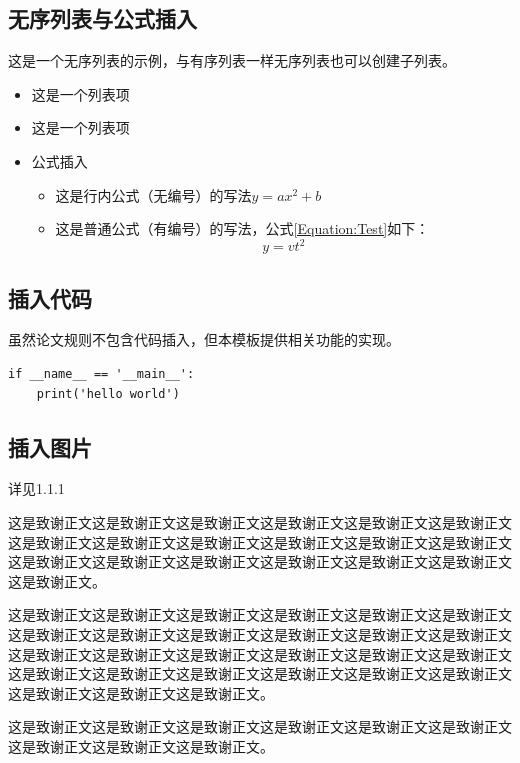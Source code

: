 \documentclass{bjfu}
\begin{document}
\subsection{无序列表与公式插入}
这是一个无序列表的示例，与有序列表一样无序列表也可以创建子列表。
\begin{itemize}
    \item 这是一个列表项
    \item 这是一个列表项
    \item 公式插入
    \begin{itemize}
        \item 这是行内公式（无编号）的写法$y=ax^2+b$
        \item 这是普通公式（有编号）的写法，公式\ref{Equation:Test}如下：
        \begin{equation}
            y=vt^2
            \label{Equation:Test}
        \end{equation}
    \end{itemize}
    
\end{itemize}

\subsection{插入代码}

虽然论文规则不包含代码插入，但本模板提供相关功能的实现。
\begin{verbatim}
if __name__ == '__main__':
    print('hello world')
\end{verbatim}

\subsection{插入图片}
详见1.1.1

\bjfuThanks
这是致谢正文这是致谢正文这是致谢正文这是致谢正文这是致谢正文这是致谢正文这是致谢正文这是致谢正文这是致谢正文这是致谢正文这是致谢正文这是致谢正文这是致谢正文这是致谢正文这是致谢正文这是致谢正文这是致谢正文这是致谢正文这是致谢正文。

这是致谢正文这是致谢正文这是致谢正文这是致谢正文这是致谢正文这是致谢正文这是致谢正文这是致谢正文这是致谢正文这是致谢正文这是致谢正文这是致谢正文这是致谢正文这是致谢正文这是致谢正文这是致谢正文这是致谢正文这是致谢正文这是致谢正文这是致谢正文这是致谢正文这是致谢正文这是致谢正文这是致谢正文这是致谢正文这是致谢正文这是致谢正文。

这是致谢正文这是致谢正文这是致谢正文这是致谢正文这是致谢正文这是致谢正文这是致谢正文这是致谢正文这是致谢正文。



\end{document}
